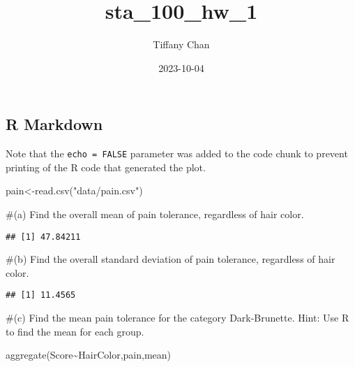 \documentclass[
]{article}
\title{sta\_100\_hw\_1}
\author{Tiffany Chan}
\date{2023-10-04}
\newenvironment{Shaded}{\begin{snugshade}}{\end{snugshade}}
\newcommand{\FunctionTok}[1]{\textcolor[rgb]{0.00,0.00,0.00}{#1}}
\newcommand{\NormalTok}[1]{#1}
\newcommand{\OtherTok}[1]{\textcolor[rgb]{0.56,0.35,0.01}{#1}}
\newcommand{\SpecialCharTok}[1]{\textcolor[rgb]{0.00,0.00,0.00}{#1}}
\newcommand{\StringTok}[1]{\textcolor[rgb]{0.31,0.60,0.02}{#1}}
\begin{document}
\maketitle

\hypertarget{r-markdown}{%
\subsection{R Markdown}\label{r-markdown}}

Note that the \texttt{echo\ =\ FALSE} parameter was added to the code
chunk to prevent printing of the R code that generated the plot.

\begin{Shaded}
\begin{Highlighting}[]
\NormalTok{pain}\OtherTok{\textless{}{-}}\FunctionTok{read.csv}\NormalTok{(}\StringTok{"data/pain.csv"}\NormalTok{)}
\end{Highlighting}
\end{Shaded}

\#(a) Find the overall mean of pain tolerance, regardless of hair color.

\begin{Shaded}
\end{Shaded}

\begin{verbatim}
## [1] 47.84211
\end{verbatim}

\#(b) Find the overall standard deviation of pain tolerance, regardless
of hair color.

\begin{Shaded}
\end{Shaded}

\begin{verbatim}
## [1] 11.4565
\end{verbatim}

\#(c) Find the mean pain tolerance for the category Dark-Brunette. Hint:
Use R to find the mean for each group.

\begin{Shaded}
\begin{Highlighting}[]
\FunctionTok{aggregate}\NormalTok{(Score}\SpecialCharTok{\textasciitilde{}}\NormalTok{HairColor,pain,mean)}
\end{Highlighting}
\end{Shaded}
\end{document}
